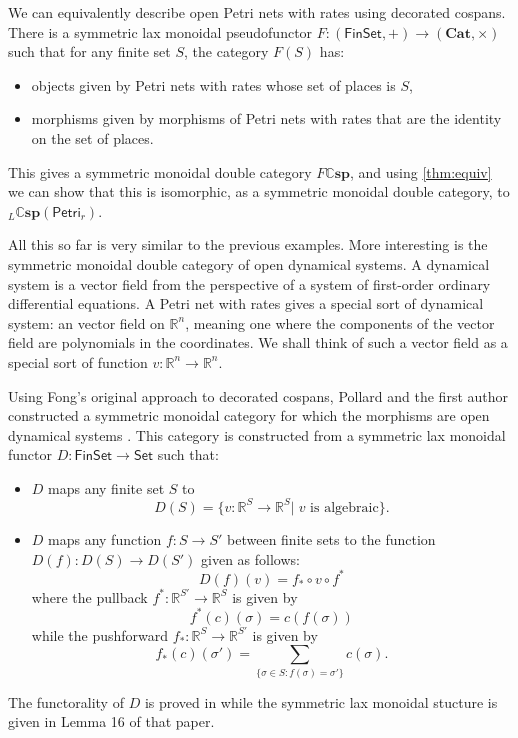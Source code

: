 \documentclass[a4paper,onecolumn, superscriptaddress,10pt, accepted=2022-03-25, issue=SS, volume=VV, shorttitle=papers/compositionality-VV-SS]{compositionalityarticle}
\newcommand{\R}{\mathbb{R}}
\let\maps\colon
\newcommand{\Set}{\mathsf{Set}}
\newcommand{\Petri}{\mathsf{Petri}}
\newcommand{\Fin}{\mathsf{Fin}}
\newcommand{\bicat}{\mathbf}
\newcommand{\Cat}{\bicat{Cat}}
\newcommand{\double}[1]{\mathbf{\mathbb #1}}
\newcommand{\lCsp}{\double{Csp}}
\newcommand{\define}[1]{{\bf \boldmath{#1}}}
\begin{document}
We can equivalently describe open Petri nets with rates using decorated cospans.  There is a symmetric lax monoidal pseudofunctor $F \maps (\Fin\Set, +) \to (\Cat, \times)$ such that for any finite set $S$, the category $F(S)$ has:
\begin{itemize}
\item objects given by Petri nets with rates whose set of places is $S$,
\item morphisms given by morphisms of Petri nets with rates that are the identity on the set of places.
\end{itemize}
This gives a symmetric monoidal double category $F \lCsp$, and using \cref{thm:equiv} we can show that this is isomorphic, as a symmetric monoidal double category, to ${}_L \lCsp(\Petri_r)$.

All this so far is very similar to the previous examples.  More interesting is the symmetric monoidal double category of open dynamical systems.   A dynamical system is a vector field from the perspective of a system of first-order ordinary differential equations. A Petri net with rates gives a special sort of dynamical system: an \define{algebraic} vector field on $\R^n$, meaning one where the components of the vector field are polynomials in the coordinates. We shall think of such a vector field as a special sort of function $v \maps \R^n \to \R^n$.

Using Fong's original approach to decorated cospans, Pollard and the first author constructed a symmetric monoidal category for which the morphisms are open dynamical systems \cite[Theorem 17]{BP}.  This category is constructed from a symmetric lax monoidal functor 
$D \maps \Fin\Set \to \Set$ such that:
\begin{itemize}
\item $D$ maps any finite set $S$ to 
\[ D(S) = \{ v \maps \R^S \to \R^S | \; v \textrm{ is algebraic}  \}. \]
\item $D$ maps any function $f \maps S \to S'$ between finite sets to the function $D(f) \maps D(S) \to D(S')$ given as follows:
\[ D(f)(v) = f_* \circ v \circ f^* \]
where the pullback $ f^* \maps \R^{S'} \to \R^S $ is given by
\[ f^*(c)(\sigma) = c(f(\sigma)) \] 
while the pushforward $ f_* \maps \R^{S} \to \R^{S'} $ is given by
\[ f_*(c)(\sigma') = \sum_{ \{ \sigma \in S : f(\sigma) = \sigma' \} } c(\sigma). \]
\end{itemize}
The functorality of $D$ is proved in \cite[Lemma 15]{BP} while the symmetric lax monoidal stucture is given in Lemma 16 of that paper.
\end{document}
